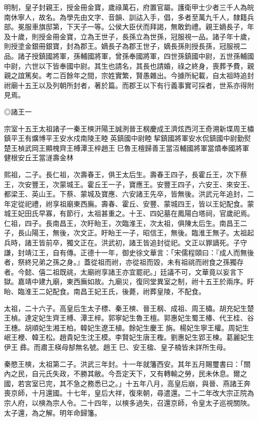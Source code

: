 

明制，皇子封親王，授金冊金寶，歲祿萬石，府置官屬。護衛甲士少者三千人為皖南休寧人，故名。為學先由文字、音韻、訓詁入手，倡，多者至萬九千人，隸籍兵部。冕服車旗邸第，下天子一等。公侯大臣伏而拜謁，無敢鈞禮。親王嫡長子，年及十歲，則授金冊金寶，立為王世子，長孫立為世孫，冠服視一品。諸子年十歲，則授塗金銀冊銀寶，封為郡王。嫡長子為郡王世子，嫡長孫則授長孫，冠服視二品。諸子授鎮國將軍，孫輔國將軍，曾孫奉國將軍，四世孫鎮國中尉，五世孫輔國中尉，六世以下皆奉國中尉。其生也請名，其長也請婚，祿之終身，喪葬予費，親親之誼篤矣。考二百餘年之間，宗姓實繁，賢愚雜出。今據所紀載，自太祖時追封祔廟十五王以及列朝所封者，著於篇。而郡王以下有行義事實可採者，世系亦得附見焉。

◎諸王一

宗室十五王太祖諸子一秦王樉汧陽王誠洌晉王㭎慶成王濟炫西河王奇溯新堞周王橚鎮平王有爌博平王安水戍南陵王睦英鎮國中尉睦挈鎮國將軍安水侃鎮國中尉勤熨楚王楨武岡王顯槐齊王榑潭王梓趙王巳魯王檀歸善王當沍輔國將軍當燌奉國將軍健根安丘王當澻壽金林

熙祖，二子。長仁祖，次壽春王，俱王太后生。壽春王四子，長霍丘王，次下蔡王，次安豐王，次蒙城王。霍丘王一子，寶應王。安豐王四子，六安王、來安王、都梁王、英山王。下蔡、蒙城及寶應、六安諸王先卒，皆無後。洪武元年追封，二年定從祀禮，祔享祖廟東西廡。壽春、霍丘、安豐、蒙城四王，皆以王妃配食。蒙城王妃田氏早寡，有節行，太祖甚重之。十王、四妃墓在鳳陽白塔祠，官歲祀焉。仁祖，四子。長南昌王，次盱眙王，次臨淮王，次太祖，俱陳太后生。南昌王二子，長山陽王，無後，次文正。盱眙王一子，昭信王，無後。臨淮王無子。太祖起兵時，諸王皆前卒，獨文正在。洪武初，諸王皆追封從祀。文正以罪謫死。子守謙，封靖江王，自有傳。正德十一年，御史徐文華言：「宋儒程頤曰：『成人而無後者，祭終兄弟之孫之身。』蓋從祖而祔，亦從祖而毀，未有祖祧而祔食之孫獨存者。今懿、僖二祖既祧，太廟祔享諸王亦宜罷祀。」廷議不可，文華竟以妄言下獄。嘉靖中建九廟，東西廡如故。九廟災，復同堂異室之制，祔十五王於兩序。盱眙、臨淮王二妃配食。南昌王妃王氏，後薨，祔葬皇陵，不配食。

太祖，二十六子。高皇后生太子標、秦王樉、晉王㭎、成祖、周王橚。胡充妃生楚王楨。達定妃生齊王榑、潭王梓。郭寧妃生魯王檀。郭惠妃生蜀王椿、代王桂、谷王橞。胡順妃生湘王柏。韓妃生遼王植。餘妃生慶王旃。楊妃生寧王權。周妃生岷王楩、韓王松。趙貴妃生沈王模。李賢妃生唐王檉。劉惠妃生郢王楝。葛麗妃生伊王彞。而肅王楧母郜無名號。趙王巳、安王楹、皇子楠皆未詳所生母。

秦愍王樉，太祖第二子。洪武三年封。十一年就籓西安。其年五月賜璽書曰：「關內之民，自元氏失政，不勝其敝。今吾定天下，又有轉輸之勞，民未休息。爾之國，若宮室已完，其不急之務悉已之。」十五年八月，高皇后崩，與晉、燕諸王奔喪京師，十月還國。十七年，皇后大祥，復來朝，尋遣還。二十二年改大宗正院為宗人府，以樉為宗人令。二十四年，以樉多過失，召還京師，令皇太子巡視關陜。太子還，為之解。明年命歸籓。

